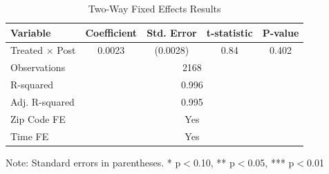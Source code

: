 \begin{table}[htbp]
\centering
\caption{Two-Way Fixed Effects Results}
\label{tab:twfe}
\begin{tabular}{lcccc}
\hline\hline
Variable & Coefficient & Std. Error & t-statistic & P-value \\
\hline
Treated $\times$ Post & 0.0023 & (0.0028) & 0.84 & 0.402 \\
\hline
Observations & \multicolumn{4}{c}{2168} \\
R-squared & \multicolumn{4}{c}{0.996} \\
Adj. R-squared & \multicolumn{4}{c}{0.995} \\
Zip Code FE & \multicolumn{4}{c}{Yes} \\
Time FE & \multicolumn{4}{c}{Yes} \\
\hline\hline
\end{tabular}
\begin{tablenotes}
\small
\item Note: Standard errors in parentheses. * p$<$0.10, ** p$<$0.05, *** p$<$0.01
\end{tablenotes}
\end{table}

